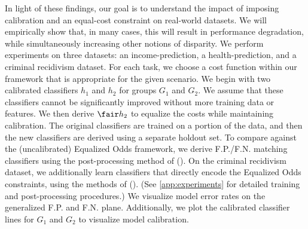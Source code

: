 In light of these findings, our goal is to understand the impact
of imposing calibration and an equal-cost constraint on
real-world datasets. We will empirically show that, in many cases, this will
result in performance degradation, while simultaneously increasing other
notions of disparity.
%
We perform experiments on three datasets: an
income-prediction, a health-prediction, and a criminal
recidivism dataset.  For each task, we
choose a cost function within our framework
that is appropriate for the given scenario.
We begin with two calibrated classifiers $h_1$ and $h_2$
for groups $G_1$ and $G_2$.
We assume that these classifiers cannot be significantly
improved without more training data or features.
We then derive $\fair h_2$ to equalize the costs while maintaining calibration.
The original classifiers are trained on a portion of the data, and then the new classifiers are
derived using a separate holdout set.
To compare against the (uncalibrated) Equalized Odds framework, we derive
F.P./F.N. matching classifiers using the post-processing
method of \cite{hardt2016equality} ({\bf \hardtetal{}}).
On the criminal recidivism dataset, we additionally learn classifiers that directly
encode the Equalized Odds constraints, using the methods of
\cite{zafar2017fairness} ({\bf \zafaretal{}}).
(See \autoref{app:experiments} for detailed training and post-processing procedures.)
%
We visualize model error rates on the
generalized F.P. and F.N. plane.
Additionally, we plot the calibrated
classifier lines for $G_1$ and $G_2$ to visualize model calibration.

